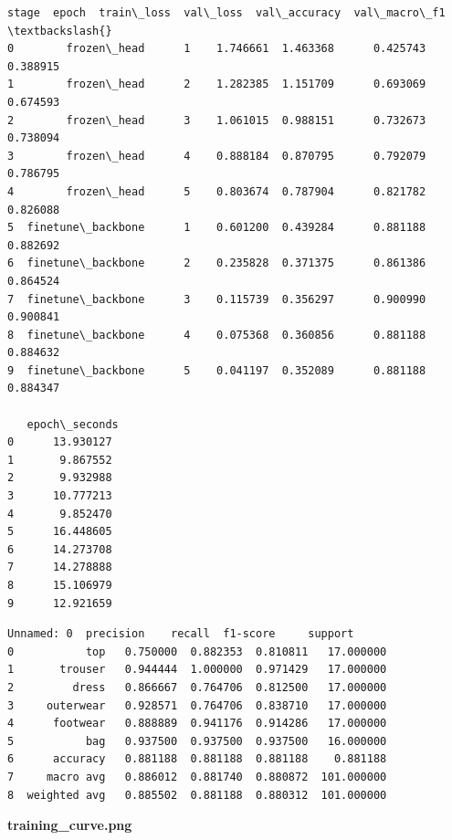 \documentclass[11pt]{article}
\begin{document}
    
    \begin{Verbatim}[commandchars=\\\{\}]
               stage  epoch  train\_loss  val\_loss  val\_accuracy  val\_macro\_f1  \textbackslash{}
0        frozen\_head      1    1.746661  1.463368      0.425743      0.388915   
1        frozen\_head      2    1.282385  1.151709      0.693069      0.674593   
2        frozen\_head      3    1.061015  0.988151      0.732673      0.738094   
3        frozen\_head      4    0.888184  0.870795      0.792079      0.786795   
4        frozen\_head      5    0.803674  0.787904      0.821782      0.826088   
5  finetune\_backbone      1    0.601200  0.439284      0.881188      0.882692   
6  finetune\_backbone      2    0.235828  0.371375      0.861386      0.864524   
7  finetune\_backbone      3    0.115739  0.356297      0.900990      0.900841   
8  finetune\_backbone      4    0.075368  0.360856      0.881188      0.884632   
9  finetune\_backbone      5    0.041197  0.352089      0.881188      0.884347   

   epoch\_seconds  
0      13.930127  
1       9.867552  
2       9.932988  
3      10.777213  
4       9.852470  
5      16.448605  
6      14.273708  
7      14.278888  
8      15.106979  
9      12.921659  
    \end{Verbatim}

    
    
    \begin{Verbatim}[commandchars=\\\{\}]
     Unnamed: 0  precision    recall  f1-score     support
0           top   0.750000  0.882353  0.810811   17.000000
1       trouser   0.944444  1.000000  0.971429   17.000000
2         dress   0.866667  0.764706  0.812500   17.000000
3     outerwear   0.928571  0.764706  0.838710   17.000000
4      footwear   0.888889  0.941176  0.914286   17.000000
5           bag   0.937500  0.937500  0.937500   16.000000
6      accuracy   0.881188  0.881188  0.881188    0.881188
7     macro avg   0.886012  0.881740  0.880872  101.000000
8  weighted avg   0.885502  0.881188  0.880312  101.000000
    \end{Verbatim}

    
    \textbf{training\_curve.png}

    
    \begin{center}
    \end{center}
    { \hspace*{\fill} \\}
    
\end{document}
